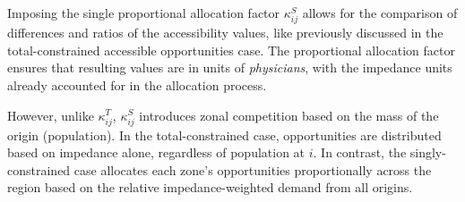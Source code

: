 \documentclass[
  10pt,
  letterpaper,
]{article}
\begin{document}
\begin{table}

\caption{\label{tbl-simple-example-attraction-constrained-accessibility}Simple
system: singly-constrained accessible opportunities.}


\end{table}%

Imposing the single proportional allocation factor \(\kappa^S_{ij}\)
allows for the comparison of differences and ratios of the accessibility
values, like previously discussed in the total-constrained accessible
opportunities case. The proportional allocation factor ensures that
resulting values are in units of \emph{physicians}, with the impedance
units already accounted for in the allocation process.

However, unlike \(\kappa^T_{ij}\), \(\kappa^S_{ij}\) introduces zonal
competition based on the mass of the origin (population). In the
total-constrained case, opportunities are distributed based on impedance
alone, regardless of population at \(i\). In contrast, the
singly-constrained case allocates each zone's opportunities
proportionally across the region based on the relative
impedance-weighted demand from all origins.
\end{document}
